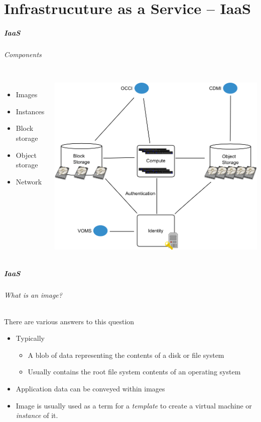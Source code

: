 \part{Infrastrucuture as a Service -- IaaS}

\begin{frame}
\frametitle{IaaS}
\framesubtitle{Components}
\begin{columns}
\begin{itemize}
\item Images
\item Instances
\item Block storage
\item Object storage
\item Network
\end{itemize}
\includegraphics[width=\textwidth]{images/IaaS_OCCI.png}
\end{columns}
\end{frame}

\begin{frame}
\frametitle{IaaS}
\framesubtitle{What is an image?}
There are various answers to this question
\begin{itemize}
\item Typically
  \begin{itemize}
  \item A blob of data representing the contents of a disk or file system
  \item Usually contains the root file system contents of an operating system
  \end{itemize}
\item Application data can be conveyed within images
\item Image is usually used as a term for a \emph{template} to create
  a virtual machine or \emph{instance} of it.
\end{itemize}
\end{frame}


